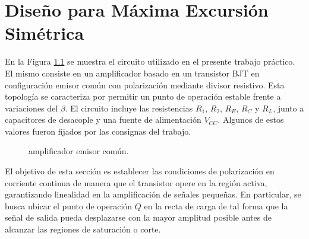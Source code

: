 \chapter{Diseño para Máxima Excursión Simétrica}
En la Figura \ref{fig:amplificador} se muestra el circuito utilizado en el presente trabajo práctico. El mismo consiste
en un amplificador basado en un transistor BJT en configuración emisor común con 
polarización mediante divisor resistivo. Esta topología se caracteriza por permitir un punto de operación
estable frente a variaciones del $\beta$. 
El circuito incluye las resistencias $R_1$, $R_2$, $R_E$, $R_C$ y $R_L$, junto a capacitores de desacople y una fuente de 
alimentación $V_{CC}$. Algunos de estos valores fueron fijados por las consignas del trabajo.

\begin{figure}[!ht]
    \centering
    \caption{amplificador emisor común.}
    \label{fig:amplificador}
\end{figure}

El objetivo de esta sección es establecer las condiciones de polarización en corriente continua de 
manera que el transistor opere en la región activa, garantizando linealidad en la 
amplificación de señales pequeñas. En particular, se busca ubicar el punto de operación $Q$ 
en la recta de carga de tal forma que la señal de salida pueda desplazarse con la mayor 
amplitud posible antes de alcanzar las regiones de saturación o corte.

